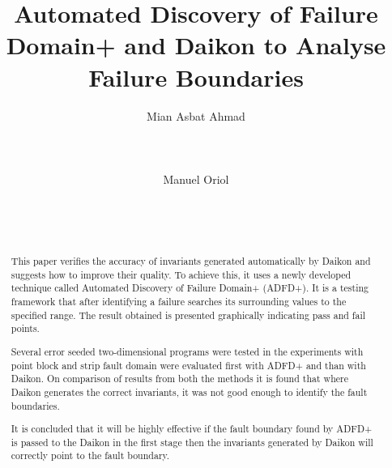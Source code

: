 \documentclass{acm_proc_article-sp}
\begin{document}
\title{Automated Discovery of Failure Domain+ and Daikon to Analyse Failure Boundaries}


%
\author{
%
%
\alignauthor
Mian Asbat Ahmad\\
       \\
       \\
       \\
\alignauthor
Manuel Oriol \\
       \\
       \\
       \\
}



\maketitle
\begin{abstract}
This paper verifies the accuracy of invariants generated automatically by Daikon and suggests how to improve their quality. To achieve this, it uses a newly developed technique called Automated Discovery of Failure Domain+ (ADFD+). It is a testing framework that after identifying a failure searches its surrounding values to the specified range. The result obtained is presented graphically indicating pass and fail points.

Several error seeded two-dimensional programs were tested in the experiments with point block and strip fault domain were evaluated first with ADFD+ and than with Daikon. On comparison of results from both the methods it is found that where Daikon generates the correct invariants, it was not good enough to identify the fault boundaries.

It is concluded that it will be highly effective if the fault boundary found by ADFD+ is passed to the Daikon in the first stage then the invariants generated by Daikon will correctly point to the fault boundary.

\end{abstract}
\end{document}
